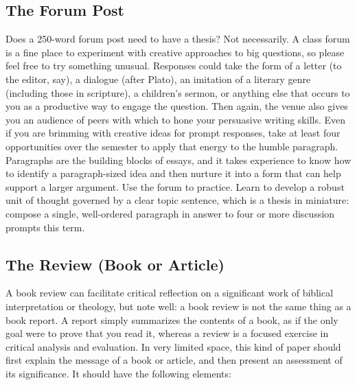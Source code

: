 \documentclass[11pt]{article}
\begin{document}
\subsection{The Forum Post}

Does a 250-word forum post need to have a thesis? Not necessarily. A
class forum is a fine place to experiment with creative approaches to
big questions, so please feel free to try something unusual. Responses
could take the form of a letter (to the editor, say), a dialogue (after
Plato), an imitation of a literary genre (including those in scripture),
a children's sermon, or anything else that occurs to you as a productive
way to engage the question. Then again, the venue also gives you an
audience of peers with which to hone your persuasive writing skills.
Even if you are brimming with creative ideas for prompt responses, take
at least four opportunities over the semester to apply that energy to
the humble paragraph. Paragraphs are the building blocks of essays, and
it takes experience to know how to identify a paragraph-sized idea and
then nurture it into a form that can help support a larger argument. Use
the forum to practice. Learn to develop a robust unit of thought
governed by a clear topic sentence, which is a thesis in miniature:
compose a single, well-ordered paragraph in answer to four or more
discussion prompts this term.

\subsection{The Review (Book or Article)}

A book review can facilitate critical reflection on a significant work
of biblical interpretation or theology, but note well: a book review is
not the same thing as a book report. A report simply summarizes the
contents of a book, as if the only goal were to prove that you read it,
whereas a review is a focused exercise in critical analysis and
evaluation. In very limited space, this kind of paper should first
explain the message of a book or article, and then present an assessment
of its significance. It should have the following elements:
\end{document}
